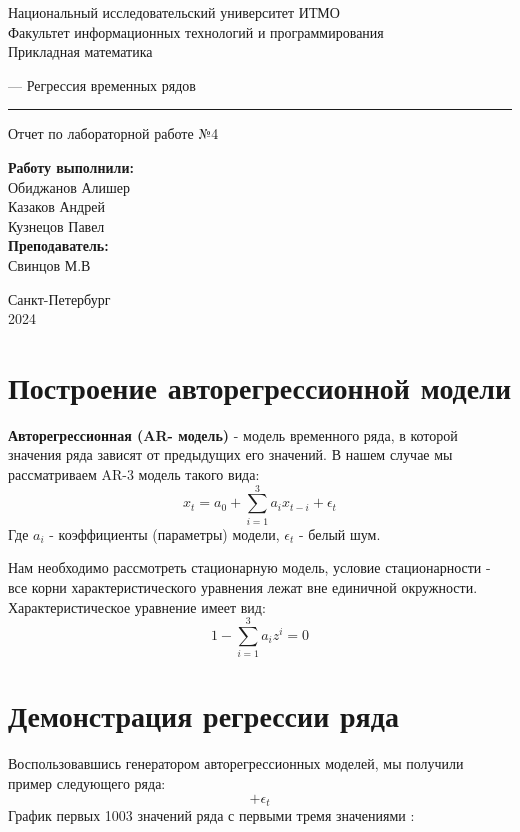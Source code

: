 \documentclass{article}
\begin{document}
\begin{center}
    Национальный исследовательский университет ИТМО\\
    Факультет информационных технологий и программирования\\
    Прикладная математика
\end{center}
\vspace{20em}
\begin{center}
    {\Large — Регрессия временных рядов}
    \vspace{3pt}
    \hrule
    \vspace{3pt}
    Отчет по лабораторной работе №4
\end{center}
\vspace{15em}
\begin{flushright}
    \textbf{ Работу выполнили: } \\
    Обиджанов Алишер\\
    Казаков Андрей\\
    Кузнецов Павел\\
    \vspace{1em}
    \textbf{ Преподаватель: } \\
    Свинцов М.В
\end{flushright}
\vspace{12em}
\begin{center}
    Санкт-Петербург \\
    2024
\end{center}
\newpage


\section{Построение авторегрессионной модели}
\textbf{Авторегрессионная (AR- модель)} - модель временного ряда, в которой значения ряда зависят от предыдущих его значений.
В нашем случае мы рассматриваем AR-3 модель такого вида:
$$ x_t = a_0 + \sum_{i=1}^{3} a_i x_{t - i} + \epsilon_t $$
Где $a_i$ - коэффициенты (параметры) модели, $\epsilon_t$ - белый шум.

Нам необходимо рассмотреть стационарную модель, условие стационарности - все корни характеристического уравнения лежат вне единичной окружности.
Характеристическое уравнение имеет вид:
$$ 1 - \sum_{i=1}^3 a_i z^i = 0 $$

\section{Демонстрация регрессии ряда}
Воспользовавшись генератором авторегрессионных моделей, мы получили пример следующего ряда:
$$ + \epsilon_t$$
График первых 1003 значений ряда с первыми тремя значениями $$:
\end{document}
